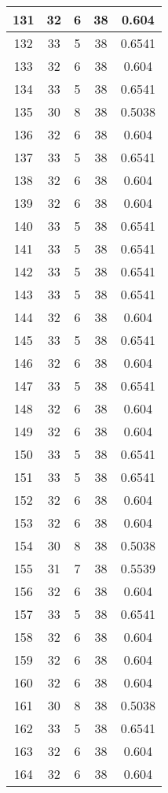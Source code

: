 \documentclass[letterpaper, 12pt]{article}
\begin{document}
\begin{longtable}{|c|c|c|c|c|}
\hline
131 & 32 & 6 & 38 & 0.604 \\
\hline
132 & 33 & 5 & 38 & 0.6541 \\
\hline
133 & 32 & 6 & 38 & 0.604 \\
\hline
134 & 33 & 5 & 38 & 0.6541 \\
\hline
135 & 30 & 8 & 38 & 0.5038 \\
\hline
136 & 32 & 6 & 38 & 0.604 \\
\hline
137 & 33 & 5 & 38 & 0.6541 \\
\hline
138 & 32 & 6 & 38 & 0.604 \\
\hline
139 & 32 & 6 & 38 & 0.604 \\
\hline
140 & 33 & 5 & 38 & 0.6541 \\
\hline
141 & 33 & 5 & 38 & 0.6541 \\
\hline
142 & 33 & 5 & 38 & 0.6541 \\
\hline
143 & 33 & 5 & 38 & 0.6541 \\
\hline
144 & 32 & 6 & 38 & 0.604 \\
\hline
145 & 33 & 5 & 38 & 0.6541 \\
\hline
146 & 32 & 6 & 38 & 0.604 \\
\hline
147 & 33 & 5 & 38 & 0.6541 \\
\hline
148 & 32 & 6 & 38 & 0.604 \\
\hline
149 & 32 & 6 & 38 & 0.604 \\
\hline
150 & 33 & 5 & 38 & 0.6541 \\
\hline
151 & 33 & 5 & 38 & 0.6541 \\
\hline
152 & 32 & 6 & 38 & 0.604 \\
\hline
153 & 32 & 6 & 38 & 0.604 \\
\hline
154 & 30 & 8 & 38 & 0.5038 \\
\hline
155 & 31 & 7 & 38 & 0.5539 \\
\hline
156 & 32 & 6 & 38 & 0.604 \\
\hline
157 & 33 & 5 & 38 & 0.6541 \\
\hline
158 & 32 & 6 & 38 & 0.604 \\
\hline
159 & 32 & 6 & 38 & 0.604 \\
\hline
160 & 32 & 6 & 38 & 0.604 \\
\hline
161 & 30 & 8 & 38 & 0.5038 \\
\hline
162 & 33 & 5 & 38 & 0.6541 \\
\hline
163 & 32 & 6 & 38 & 0.604 \\
\hline
164 & 32 & 6 & 38 & 0.604 \\

\end{longtable}
\end{document}
